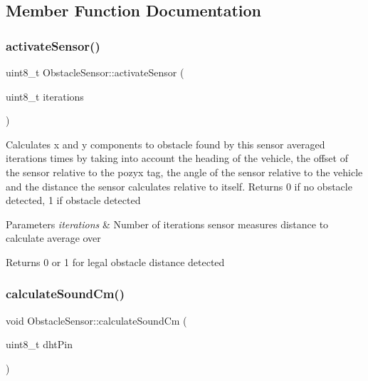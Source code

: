 \subsection{Member Function Documentation}
\mbox{\label{class_obstacle_sensor_ae451cef8461f01b1672fcf4dd18eb6de}} 
\subsubsection{\texorpdfstring{activate\+Sensor()}{activateSensor()}}
{\footnotesize\ttfamily uint8\+\_\+t Obstacle\+Sensor\+::activate\+Sensor (\begin{DoxyParamCaption}\item[{uint8\+\_\+t}]{iterations }\end{DoxyParamCaption})}

Calculates x and y components to obstacle found by this sensor averaged iterations times by taking into account the heading of the vehicle, the offset of the sensor relative to the pozyx tag, the angle of the sensor relative to the vehicle and the distance the sensor calculates relative to itself. Returns 0 if no obstacle detected, 1 if obstacle detected 
\begin{DoxyParams}{Parameters}
{\em iterations} & Number of iterations sensor measures distance to calculate average over \\
\hline
\end{DoxyParams}
\begin{DoxyReturn}{Returns}
0 or 1 for legal obstacle distance detected 
\end{DoxyReturn}
\mbox{\label{class_obstacle_sensor_a309eb490fce98867856521dd270f6e97}} 
\subsubsection{\texorpdfstring{calculate\+Sound\+Cm()}{calculateSoundCm()}}
{\footnotesize\ttfamily void Obstacle\+Sensor\+::calculate\+Sound\+Cm (\begin{DoxyParamCaption}\item[{uint8\+\_\+t}]{dht\+Pin }\end{DoxyParamCaption})\hspace{0.3cm}{\ttfamily [static]}}

